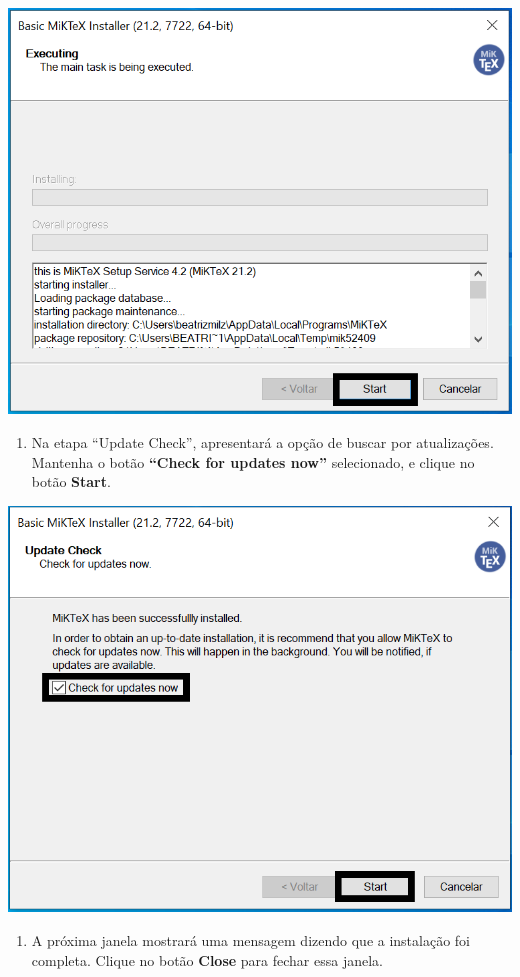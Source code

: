 \documentclass[
]{book}
\providecommand{\tightlist}{%
  \setlength{\itemsep}{0pt}\setlength{\parskip}{0pt}}
\begin{document}
\begin{center}\includegraphics[width=0.8\linewidth]{img/instalacao/miktex_windows/win_miktex6} \end{center}

\begin{enumerate}
\def\labelenumi{\arabic{enumi}.}
\setcounter{enumi}{7}
\tightlist
\item
  Na etapa ``Update Check'', apresentará a opção de buscar por atualizações. Mantenha o botão \textbf{``Check for updates now''} selecionado, e clique no botão \textbf{Start}.
\end{enumerate}

\begin{center}\includegraphics[width=0.8\linewidth]{img/instalacao/miktex_windows/win_miktex7} \end{center}

\begin{enumerate}
\def\labelenumi{\arabic{enumi}.}
\setcounter{enumi}{8}
\tightlist
\item
  A próxima janela mostrará uma mensagem dizendo que a instalação foi completa. Clique no botão \textbf{Close} para fechar essa janela.
\end{enumerate}
\end{document}
